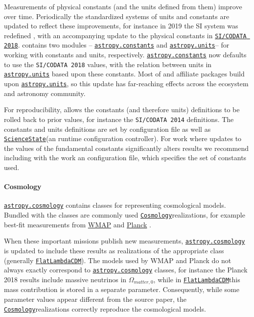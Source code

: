 \documentclass[modern]{aastex631}
\newcommand{\astropysubpkg}[1]{\href{http://docs.astropy.org/en/stable/#1/index.html}{\texttt{astropy.#1}}\xspace}
\newcommand{\astropycosmology}{\astropysubpkg{cosmology}}
\newcommand{\astropyunits}{\astropysubpkg{units}}
\newcommand{\astropyconstants}{\astropysubpkg{constants}}
\newcommand{\astropyapi}[2]{\href{https://docs.astropy.org/en/stable/api/astropy.#1.html}{#2}}
\newcommand{\astropyapidoc}[2]{\astropyapi{#1}{\texttt{#2}\xspace}}
\newcommand{\astropyCosmology}{\astropyapidoc{cosmology.Cosmology}{Cosmology}}
\newcommand{\astropyFlatLambdaCDM}{\astropyapidoc{cosmology.FlatLambdaCDM}{FlatLambdaCDM}}
\newcommand{\astropyScienceState}{\astropyapidoc{utils.state.ScienceState}{ScienceState}}
\begin{document}
    Measurements of physical constants (and the units defined from them) improve
    over time. Periodically the standardized systems of units and constants are
    updated to reflect these improvements, for instance in 2019 the SI system was
    redefined \citep{NIST2019}, with an accompanying update to the physical
    constants in
    \href{https://codata.org/initiatives/data-science-and-stewardship/fundamental-physical-constants/}{\texttt{SI/CODATA
    2018}}. \astropypkg contains two modules -- \astropyconstants and
    \astropyunits -- for working with constants and units, respectively.
    \astropyconstants now defaults to use the \texttt{SI/CODATA 2018} values, with
    the relation between units in \astropyunits based upon these constants. Most
    of \astropypkg and affiliate packages build upon \astropyunits, so this update
    has far-reaching effects across the \astropy ecosystem and astronomy
    community.

    For reproducibility, \astropypkg allows the constants (and therefore units)
    definitions to be rolled back to prior values, for instance the
    \texttt{SI/CODATA 2014} definitions.
    The constants and units definitions are set by configuration file as well as
    \astropyScienceState (an runtime configuration controller). For work where
    updates to the values of the fundamental constants significantly alters
    results we recommend including with the work an \astropy configuration file,
    which specifies the set of constants used.

  \paragraph{Cosmology}

    \astropycosmology contains classes for representing cosmological models.
    Bundled with the classes are commonly used \astropyCosmology realizations, for
    example best-fit measurements from
    \href{https://lambda.gsfc.nasa.gov/product/map/current/}{WMAP}
    \citep{WMAP2003} and \href{https://www.nasa.gov/mission_pages/planck}{Planck}
    \citep{PlanckMission:2006}.

    When these important missions publish new measurements, \astropycosmology is
    updated to include these results as realizations of the appropriate class
    (generally \astropyFlatLambdaCDM). The models used by WMAP and Planck do not
    always exactly correspond to \astropycosmology classes, for instance the
    Planck 2018 results \citep{Planck2018VI} include massive neutrinos in
    $\Omega_{matter,0}$, while in \astropyFlatLambdaCDM this mass contribution is
    stored in a separate parameter. Consequently, while some parameter values
    appear different from the source paper, the \astropyCosmology realizations
    correctly reproduce the cosmological models.
\end{document}
